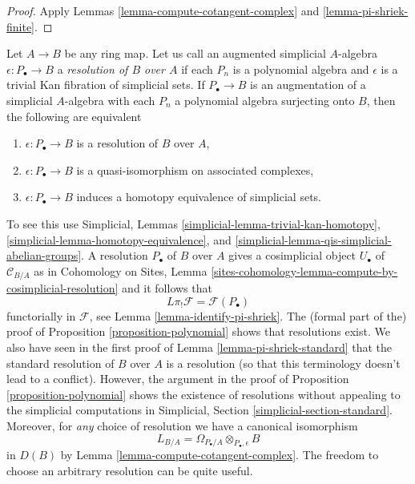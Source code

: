 \begin{proof}
Apply Lemmas \ref{lemma-compute-cotangent-complex} and
\ref{lemma-pi-shriek-finite}.
\end{proof}

\begin{remark}[Resolutions]
\label{remark-resolution}
Let $A \to B$ be any ring map. Let us call an augmented simplicial $A$-algebra
$\epsilon : P_\bullet \to B$ a {\it resolution of $B$ over $A$} if
each $P_n$ is a polynomial algebra and $\epsilon$ is a trivial Kan fibration
of simplicial sets. If $P_\bullet \to B$ is an augmentation of a simplicial
$A$-algebra with each $P_n$ a polynomial algebra surjecting onto $B$, then
the following are equivalent
\begin{enumerate}
\item $\epsilon : P_\bullet \to B$ is a resolution of $B$ over $A$,
\item $\epsilon : P_\bullet \to B$ is a quasi-isomorphism on
associated complexes,
\item $\epsilon : P_\bullet \to B$ induces a homotopy equivalence
of simplicial sets.
\end{enumerate}
To see this use Simplicial, Lemmas
\ref{simplicial-lemma-trivial-kan-homotopy},
\ref{simplicial-lemma-homotopy-equivalence}, and
\ref{simplicial-lemma-qis-simplicial-abelian-groups}.
A resolution $P_\bullet$ of $B$ over $A$ gives a cosimplicial object
$U_\bullet$ of $\mathcal{C}_{B/A}$ as in Cohomology on Sites, Lemma
\ref{sites-cohomology-lemma-compute-by-cosimplicial-resolution}
and it follows that
$$
L\pi_!\mathcal{F} = \mathcal{F}(P_\bullet)
$$
functorially in $\mathcal{F}$, see Lemma \ref{lemma-identify-pi-shriek}.
The (formal part of the) proof of Proposition \ref{proposition-polynomial}
shows that resolutions exist. We also have seen in the first proof of
Lemma \ref{lemma-pi-shriek-standard} that the standard resolution of $B$
over $A$ is a resolution (so that this terminology doesn't lead to a conflict).
However, the argument in the proof of Proposition \ref{proposition-polynomial}
shows the existence of resolutions without appealing to the simplicial
computations in Simplicial, Section \ref{simplicial-section-standard}.
Moreover, for {\it any} choice of resolution we have a canonical isomorphism
$$
L_{B/A} = \Omega_{P_\bullet/A} \otimes_{P_\bullet, \epsilon} B
$$
in $D(B)$ by Lemma \ref{lemma-compute-cotangent-complex}. The freedom to
choose an arbitrary resolution can be quite useful.
\end{remark}

